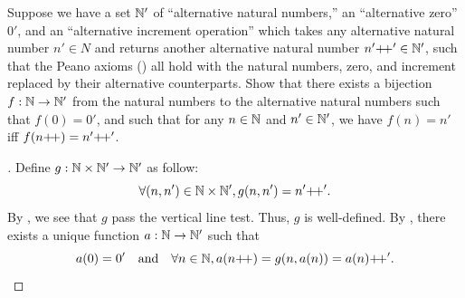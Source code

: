 \begin{ex}\label{i:ex:3.5.13}
  Suppose we have a set \(\mathbb{N}'\) of ``alternative natural numbers,'' an ``alternative zero'' \(0'\), and an ``alternative increment operation'' which takes any alternative natural number \(n' \in N\) and returns another alternative natural number \(n'{+}\!{+}' \in \mathbb{N}'\), such that the Peano axioms () all hold with the natural numbers, zero, and increment replaced by their alternative counterparts.
  Show that there exists a bijection \(f : \mathbb{N} \to \mathbb{N}'\) from the natural numbers to the alternative natural numbers such that \(f(0) = 0'\), and such that for any \(n \in \mathbb{N}\) and \(n' \in \mathbb{N}'\), we have \(f(n) = n'\) iff \(f(n{+}\!{+}) = n'{+}\!{+}'\).
\end{ex}

\begin{proof}[]
  Define \(g : \mathbb{N} \times \mathbb{N}' \to \mathbb{N}'\) as follow:
  \[
    \forall (n, n') \in \mathbb{N} \times \mathbb{N}', g(n, n') = n'{+}\!{+}'.
  \]
  By , we see that \(g\) pass the vertical line test.
  Thus, \(g\) is well-defined.
  By , there exists a unique function \(a : \mathbb{N} \to \mathbb{N}'\) such that
  \[
    a(0) = 0' \quad \text{and} \quad \forall n \in \mathbb{N}, a(n{+}\!{+}) = g(n, a(n)) = a(n){+}\!{+}'.
  \]


\end{proof}
